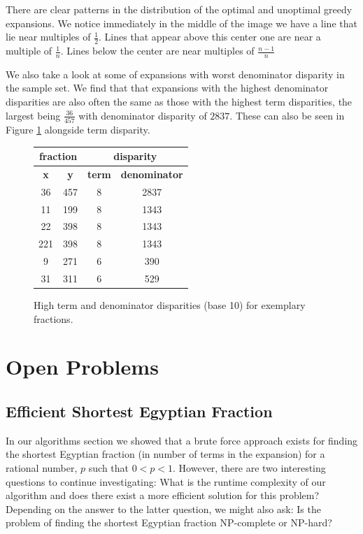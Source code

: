 \documentclass[paper=a4, fontsize=11pt]{scrartcl}
\numberwithin{equation}{section}	 %
\numberwithin{figure}{section}	 %
\numberwithin{table}{section}	 %
\begin{document}
There are clear patterns in the distribution of the optimal and unoptimal greedy expansions. We notice immediately in the middle of the image we have a line that lie near multiples of $\frac{1}{2}$. Lines that appear above this center one are near a multiple of $\frac{1}{n}$. Lines below the center are near multiples of $\frac{n-1}{n}$

We also take a look at some of expansions with worst denominator disparity in the sample set. We find that that expansions with the highest denominator disparities are also often the same as those with the highest term disparities, the largest being $\frac{36}{457}$ with denominator disparity of $2837$. These can also be seen in Figure \ref{fig:disparity} alongside term disparity.

\begin{figure}[t]
\centering
\begin{tabular}{|c|c|c|c|}
    \hline
    \multicolumn{2}{|c|}{\textbf{fraction}} & \multicolumn{2}{|c|}{\textbf{disparity}} \\ \hline
	\textbf{x} & \textbf{y} & \textbf{term} & \textbf{denominator} \\ \hline\hline
	36 & 457 & 8 & 2837 \\ \hline
	11 & 199 & 8 & 1343 \\ \hline
    22 & 398 & 8 & 1343 \\ \hline
    221 & 398 & 8 & 1343 \\ \hline
    9 & 271 & 6 & 390 \\ \hline
    31 & 311 & 6 & 529 \\ \hline
\end{tabular}
\caption{High term and denominator disparities (base 10) for exemplary fractions.}
\label{fig:disparity}
\end{figure}
 
\section{Open Problems}
\subsection{Efficient Shortest Egyptian Fraction}

In our algorithms section we showed that a brute force approach exists for finding the shortest Egyptian fraction (in number of terms in the expansion) for a rational number, $p$ such that $0 < p < 1$. However, there are two interesting questions to continue investigating: What is the runtime complexity of our algorithm and does there exist a more efficient solution for this problem? Depending on the answer to the latter question, we might also ask: Is the problem of finding the shortest Egyptian fraction NP-complete or NP-hard?
\end{document}
